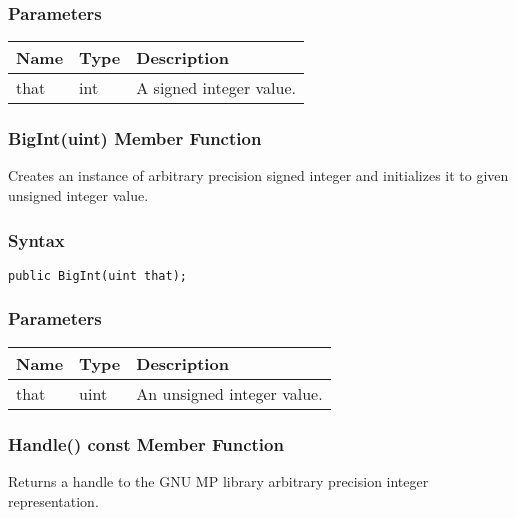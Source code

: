 \documentclass[a4paper,oneside,11.000000pt]{book}
\begin{document}
\subsubsection*{Parameters}
\begin{flushleft}
\begin{supertabular}[l]{lll}
\textbf{Name}
& \textbf{Type}
& \textbf{Description}
\\
\hline
that
& int
& A signed integer value.

\\
\end{supertabular}

\end{flushleft}
\clearpage

\hypertarget{System.Numerics.Multiprecision.BigInt.constructor.P.System.Numerics.Multiprecision.BigInt.uint}{\subsubsection*{BigInt(uint) Member Function}}
\begin{flushleft}
Creates an instance of arbitrary precision signed integer and initializes it to given unsigned integer value.

\end{flushleft}
\subsubsection*{Syntax}\texttt{public BigInt(uint that);}

\subsubsection*{Parameters}
\begin{flushleft}
\begin{supertabular}[l]{lll}
\textbf{Name}
& \textbf{Type}
& \textbf{Description}
\\
\hline
that
& uint
& An unsigned integer value.

\\
\end{supertabular}

\end{flushleft}
\clearpage

\hypertarget{System.Numerics.Multiprecision.BigInt.Handle.C.P.System.Numerics.Multiprecision.BigInt}{\subsubsection*{Handle() const Member Function}}
\begin{flushleft}
Returns a handle to the GNU MP library arbitrary precision integer representation.

\end{flushleft}
\end{document}

